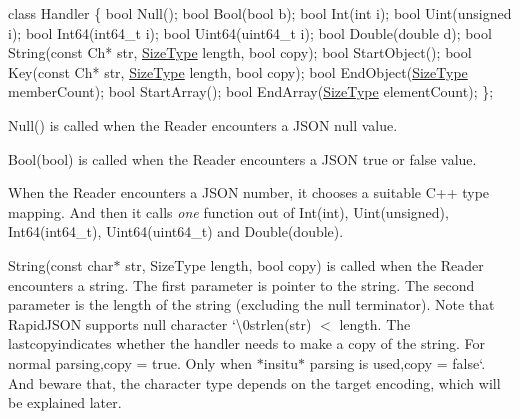 \begin{DoxyCode}
\textcolor{keyword}{class }Handler \{
    \textcolor{keywordtype}{bool} Null();
    \textcolor{keywordtype}{bool} Bool(\textcolor{keywordtype}{bool} b);
    \textcolor{keywordtype}{bool} Int(\textcolor{keywordtype}{int} i);
    \textcolor{keywordtype}{bool} Uint(\textcolor{keywordtype}{unsigned} i);
    \textcolor{keywordtype}{bool} Int64(int64\_t i);
    \textcolor{keywordtype}{bool} Uint64(uint64\_t i);
    \textcolor{keywordtype}{bool} Double(\textcolor{keywordtype}{double} d);
    \textcolor{keywordtype}{bool} String(\textcolor{keyword}{const} Ch* str, \hyperlink{rapidjson_8h_a5ed6e6e67250fadbd041127e6386dcb5}{SizeType} length, \textcolor{keywordtype}{bool} copy);
    \textcolor{keywordtype}{bool} StartObject();
    \textcolor{keywordtype}{bool} Key(\textcolor{keyword}{const} Ch* str, \hyperlink{rapidjson_8h_a5ed6e6e67250fadbd041127e6386dcb5}{SizeType} length, \textcolor{keywordtype}{bool} copy);
    \textcolor{keywordtype}{bool} EndObject(\hyperlink{rapidjson_8h_a5ed6e6e67250fadbd041127e6386dcb5}{SizeType} memberCount);
    \textcolor{keywordtype}{bool} StartArray();
    \textcolor{keywordtype}{bool} EndArray(\hyperlink{rapidjson_8h_a5ed6e6e67250fadbd041127e6386dcb5}{SizeType} elementCount);
\};
\end{DoxyCode}


{\ttfamily Null()} is called when the {\ttfamily Reader} encounters a J\+S\+ON null value.

{\ttfamily Bool(bool)} is called when the {\ttfamily Reader} encounters a J\+S\+ON true or false value.

When the {\ttfamily Reader} encounters a J\+S\+ON number, it chooses a suitable C++ type mapping. And then it calls {\itshape one} function out of {\ttfamily Int(int)}, {\ttfamily Uint(unsigned)}, {\ttfamily Int64(int64\+\_\+t)}, {\ttfamily Uint64(uint64\+\_\+t)} and {\ttfamily Double(double)}.

{\ttfamily String(const char$\ast$ str, Size\+Type length, bool copy)} is called when the {\ttfamily Reader} encounters a string. The first parameter is pointer to the string. The second parameter is the length of the string (excluding the null terminator). Note that Rapid\+J\+S\+ON supports null character `\textquotesingle{}\textbackslash{}0strlen(str) $<$ length{\ttfamily . The last}copy{\ttfamily indicates whether the handler needs to make a copy of the string. For normal parsing,}copy = true{\ttfamily . Only when $\ast$insitu$\ast$ parsing is used,}copy = false`. And beware that, the character type depends on the target encoding, which will be explained later.

